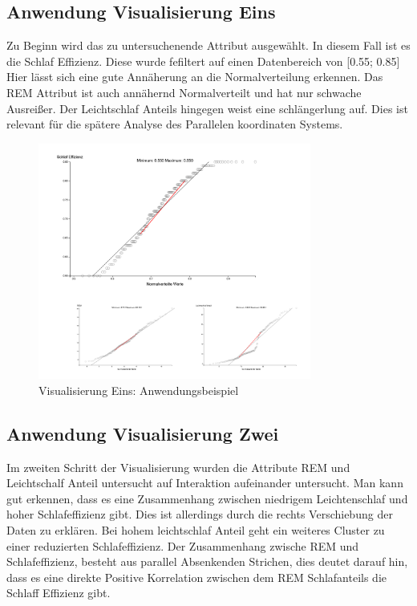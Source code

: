 \documentclass[usegeometry=true]{scrartcl}
\begin{document}
\subsection{Anwendung Visualisierung Eins}
 Zu Beginn wird das zu untersuchenende Attribut ausgewählt. In diesem Fall ist es die Schlaf Effizienz. Diese wurde fefiltert auf einen Datenbereich von [0.55; 0.85]
 Hier lässt sich eine gute Annäherung an die Normalverteilung erkennen. Das REM Attribut ist auch annähernd Normalverteilt und hat nur schwache Ausreißer. Der Leichtschlaf Anteils hingegen weist eine schlängerlung auf. Dies ist relevant für die spätere Analyse des Parallelen koordinaten Systems.
\begin{figure}[h]
  \centering
  \includegraphics[width = 0.8\textwidth]{Bsp_QQ-Plot.JPG}
  \caption{Visualisierung Eins: Anwendungsbeispiel}
\end{figure}

\subsection{Anwendung Visualisierung Zwei}

Im zweiten Schritt der Visualisierung wurden die Attribute REM und Leichtschalf Anteil untersucht auf Interaktion aufeinander untersucht. Man kann gut erkennen, dass es eine Zusammenhang zwischen niedrigem Leichtenschlaf und hoher Schlafeffizienz gibt. Dies ist allerdings durch die rechts Verschiebung der Daten zu erklären. Bei hohem leichtschlaf Anteil geht ein weiteres Cluster zu einer reduzierten Schlafeffizienz. 
Der Zusammenhang zwische REM und Schlafeffizienz, besteht aus parallel Absenkenden Strichen, dies deutet darauf hin, dass es eine direkte Positive Korrelation zwischen dem REM Schlafanteils die Schlaff Effizienz gibt.
\end{document}
